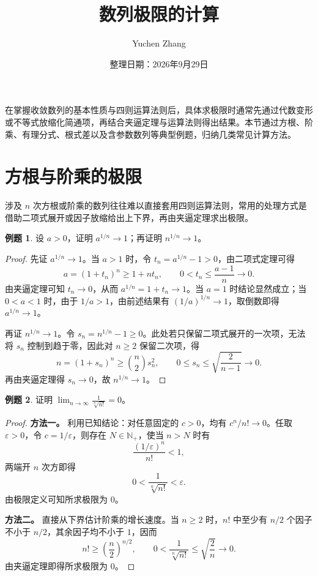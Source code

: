 \documentclass[UTF8, fontset=fandol, a4paper, 12pt]{ctexart}
\title{数列极限的计算}
\author{Yuchen Zhang}
\date{整理日期：2026年9月29日}
\makeatletter
\newcommand{\Nplus}{\mathbb N_{+}}
\theoremstyle{definition}
\renewcommand{\maketitle}{\begin{center}
{\LARGE\bfseries \@title\par}\vspace{0.6em}
\@author\par\vspace{0.2em}{\small\@date\par}
\end{center}}
\newtheorem{example}{例题}
\makeatother
\begin{document}
\maketitle

在掌握收敛数列的基本性质与四则运算法则后，具体求极限时通常先通过代数变形或不等式放缩化简通项，再结合夹逼定理与运算法则得出结果。本节通过方根、阶乘、有理分式、根式差以及含参数数列等典型例题，归纳几类常见计算方法。

\section{方根与阶乘的极限}
涉及 $n$ 次方根或阶乘的数列往往难以直接套用四则运算法则，常用的处理方式是借助二项式展开或因子放缩给出上下界，再由夹逼定理求出极限。

\begin{example}
设 $a>0$，证明 $a^{1/n}\to1$；再证明 $n^{1/n}\to1$。
\end{example}
\begin{proof}
先证 $a^{1/n}\to1$。当 $a>1$ 时，令 $t_n=a^{1/n}-1>0$，由二项式定理可得
\[
 a=(1+t_n)^n\ge1+nt_n,\qquad
 0<t_n\le\frac{a-1}{n}\longrightarrow0.
\]
由夹逼定理可知 $t_n\to0$，从而 $a^{1/n}=1+t_n\to1$。当 $a=1$ 时结论显然成立；当 $0<a<1$ 时，由于 $1/a>1$，由前述结果有 $(1/a)^{1/n}\to1$，取倒数即得 $a^{1/n}\to1$。

再证 $n^{1/n}\to1$。令 $s_n=n^{1/n}-1\ge0$。此处若只保留二项式展开的一次项，无法将 $s_n$ 控制到趋于零，因此对 $n\ge2$ 保留二次项，得
\[
 n=(1+s_n)^n\ge\binom n2s_n^2,\qquad
 0\le s_n\le\sqrt{\frac2{n-1}}\longrightarrow0.
\]
再由夹逼定理得 $s_n\to0$，故 $n^{1/n}\to1$。
\end{proof}

\begin{example}
证明 $\displaystyle\lim_{n\to\infty}\frac1{\sqrt[n]{n!}}=0$。
\end{example}
\begin{proof}
\textbf{方法一。} 利用已知结论：对任意固定的 $c>0$，均有 $c^n/n!\to0$。任取 $\varepsilon>0$，令 $c=1/\varepsilon$，则存在 $N\in\Nplus$，使当 $n>N$ 时有
\[
 \frac{(1/\varepsilon)^n}{n!}<1,
\]
两端开 $n$ 次方即得
\[
 0<\frac1{\sqrt[n]{n!}}<\varepsilon.
\]
由极限定义可知所求极限为 $0$。

\textbf{方法二。} 直接从下界估计阶乘的增长速度。当 $n\ge2$ 时，$n!$ 中至少有 $n/2$ 个因子不小于 $n/2$，其余因子均不小于 $1$，因而
\[
 n!\ge\left(\frac n2\right)^{n/2},\qquad
 0<\frac1{\sqrt[n]{n!}}\le\sqrt{\frac2n}\longrightarrow0.
\]
由夹逼定理即得所求极限为 $0$。
\end{proof}
\end{document}
